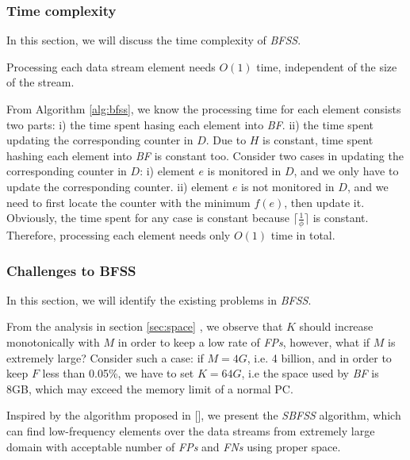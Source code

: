 \documentclass[conference]{IEEEtran}
\begin{document}
\subsubsection{\textbf{Time complexity}}
In this section, we will discuss the time complexity of \emph{BFSS}.

\begin{theorem}\label{thm:5}
Processing each data stream element needs $O(1)$ time, independent of the size of the stream.
\end{theorem}

\begin{IEEEproof}
From Algorithm \ref{alg:bfss}, we know the processing time for each element consists two parts: i) the time spent hasing each element into \emph{BF}. ii) the time spent updating the corresponding counter in $D$. Due to $H$ is constant, time spent hashing each element into \emph{BF} is constant too. Consider two cases in updating the corresponding counter in $D$: i) element $e$ is monitored in $D$, and we only have to update the corresponding counter. ii) element $e$ is not monitored in $D$, and we need to first locate the counter with the minimum $f(e)$, then update it. Obviously, the time spent for any case is constant because $\lceil \frac{1}{\phi}\rceil$ is constant. Therefore, processing each element needs only $O(1)$ time in total.
\end{IEEEproof}

\subsubsection{\textbf{Challenges to BFSS}}
In this section, we will identify the existing problems in \emph{BFSS}.\par
From the analysis in section \ref{sec:space} , we observe that $K$ should increase monotonically with $M$ in order to keep a low rate of \emph{FPs}, however, what if $M$ is extremely large? Consider such a case: if $M=4G$, i.e. 4 billion, and in order to keep $F$ less than 0.05\%, we have to set $K=64G$, i.e the space used by \emph{BF} is 8GB, which may exceed the memory limit of a normal PC.\par
Inspired by the algorithm proposed in [], we present the \emph{SBFSS} algorithm, which can find low-frequency elements over the data streams from extremely large domain with acceptable number of \emph{FPs} and \emph{FNs} using proper space.\par
\end{document}
